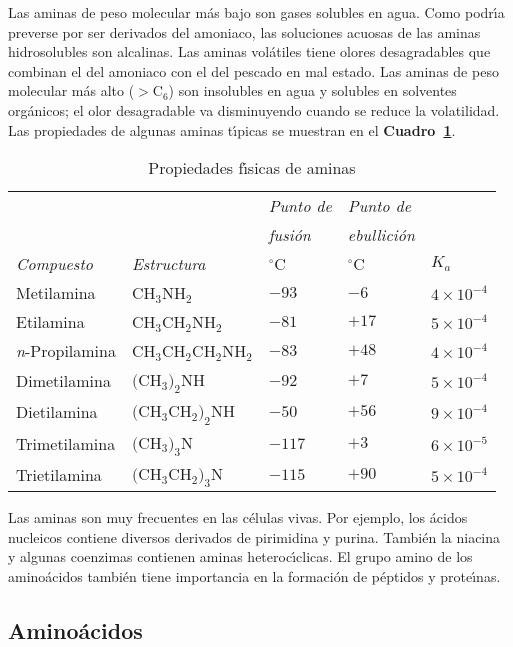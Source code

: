 Las aminas de peso molecular m\'as bajo son gases solubles en agua. Como podr\'{\i}a preverse  por ser derivados del amoniaco, las soluciones
acuosas de las aminas hidrosolubles son alcalinas. Las aminas vol\'atiles tiene olores desagradables que combinan el del amoniaco con el del
pescado en mal estado. Las aminas de peso molecular m\'as alto ($>$C$_6$) son insolubles en agua y solubles en solventes org\'anicos; el olor
desagradable va disminuyendo cuando se reduce la volatilidad. Las propiedades de algunas aminas t\'{\i}picas se muestran en el \textbf{Cuadro~\ref{aminas}}.
\begin{table}[hbt]
\caption{Propiedades f\'{\i}sicas de aminas}
\label{aminas}
{\small 
\begin{center}
\begin{tabular}{lllll}\hline
&&\textit{Punto de }&\textit{Punto de}\\
&&\textit{fusi\'on}&\textit{ebullici\'on}\\
\textit{Compuesto}&\textit{Estructura}&$^\circ$C&$^\circ$C&$K_a$\\[0.05in]
\hline Metilamina  &CH$_3$NH$_2$      & $-93$& $ -6$ & $4\times10^{-4}$\\
Etilamina   &CH$_3$CH$_2$NH$_2$& $-81$& $+17$ & $5\times10^{-4}$\\
\textit{n}-Propilamina& CH$_3$CH$_2$CH$_2$NH$_2$&$-83$& $+48$ &
$4\times10^{-4}$\\
Dimetilamina & $($CH$_3)_2$NH& $-92$& $ +7$ & $5\times10^{-4}$\\
Dietilamina &$($CH$_3$CH$_2)_2$NH& $-50$& $ +56$ & $9\times10^{-4}$\\
Trimetilamina&$($CH$_3)_3$N   & $-117$& $ +3$ & $6\times10^{-5}$\\
Trietilamina &$($CH$_3$CH$_2)_3$N& $-115$& $ +90$ & $5\times10^{-4}$
\\[0.05in]
\hline
\end{tabular}
\end{center}
}\end{table}

Las aminas son muy frecuentes en las c\'elulas vivas. Por ejemplo, los \'acidos nucleicos contiene diversos derivados de pirimidina y purina.
Tambi\'en la niacina y algunas coenzimas contienen aminas heteroc\'{\i}clicas. El grupo amino de los amino\'acidos tambi\'en tiene importancia en la formaci\'on de p\'eptidos y prote\'{\i}nas. 

 \subsection{Amino\'acidos }

